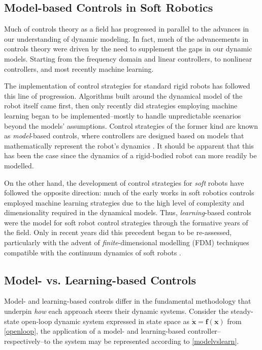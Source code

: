 \subsection{Model-based Controls in Soft Robotics}
Much of controls theory as a field has progressed in parallel to the advances in our understanding of dynamic modeling. In fact, much of the advancements in controls theory were driven by the need to supplement the gaps in our dynamic models. Starting from the frequency domain and linear controllers, to nonlinear controllers, and most recently machine learning. 

The implementation of control strategies for standard rigid robots has followed this line of progression. Algorithms built around the dynamical model of the robot itself came first, then only recently did strategies employing machine learning began to be implemented--mostly to handle unpredictable scenarios beyond the models' assumptions. Control strategies of the former kind are known as \textit{model}-based controls, where controllers are designed based on models that mathematically represent the robot's dynamics \cite{rakhmatillaev_integrative_2025}. It should be apparent that this has been the case since the dynamics of a rigid-bodied robot can more readily be modelled. 

On the other hand, the development of control strategies for \textit{soft} robots have followed the opposite direction: much of the early works in soft robotics controls employed machine learning strategies due to the high level of complexity and dimensionality required in the dynamical models. Thus, \textit{learning}-based controls were the model for soft robot control strategies through the formative years of the field. Only in recent years did this precedent began to be re-assessed, particularly with the advent of \textit{finite}-dimensional modelling (FDM) techniques compatible with the continuum dynamics of soft robots \cite{della_santina_model-based_2023}.
\subsection{Model- vs. Learning-based Controls}

Model- and learning-based controls differ in the fundamental methodology that underpin \textit{how} each approach steers their dynamic systems. Consider the steady-state open-loop dynamic system expressed in state space as $\mathbf{\dot{x}}=\mathbf{f}(\mathbf{x})$ from \autoref{openloop}, the application of a model- and learning-based controller--respectively--to the system may be represented according to \autoref{modelvslearn}.

